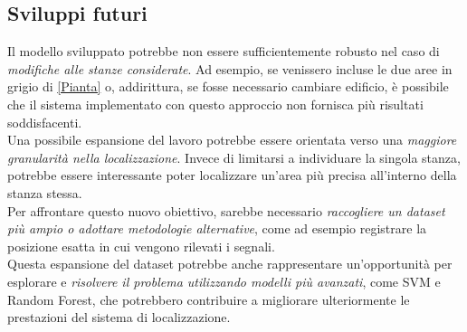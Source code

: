 \documentclass{article}
\begin{document}
\subsection{Sviluppi futuri}
Il modello sviluppato potrebbe non essere sufficientemente robusto nel caso di \textit{modifiche alle stanze considerate}. Ad esempio, se venissero incluse le due aree in grigio di \autoref{Pianta} o, addirittura, se fosse necessario cambiare edificio, è possibile che il sistema implementato con questo approccio non fornisca più risultati soddisfacenti.\\

Una possibile espansione del lavoro potrebbe essere orientata verso una \textit{maggiore granularità nella localizzazione}. Invece di limitarsi a individuare la singola stanza, potrebbe essere interessante poter localizzare un'area più precisa all'interno della stanza stessa.\\

Per affrontare questo nuovo obiettivo, sarebbe necessario \textit{raccogliere un dataset più ampio o adottare metodologie alternative}, come ad esempio registrare la posizione esatta in cui vengono rilevati i segnali.\\

Questa espansione del dataset potrebbe anche rappresentare un'opportunità per esplorare e \textit{risolvere il problema utilizzando modelli più avanzati}, come SVM e Random Forest, che potrebbero contribuire a migliorare ulteriormente le prestazioni del sistema di localizzazione.


\newpage

\end{document}
